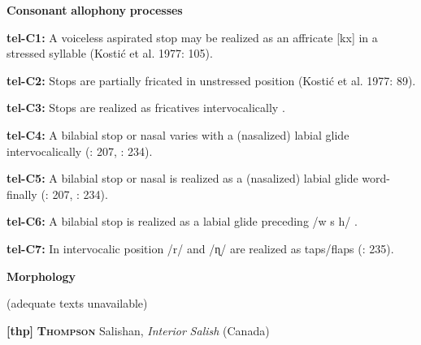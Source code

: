 \begin{styleBody}
\textbf{Consonant} \textbf{allophony} \textbf{processes}
\end{styleBody}

\begin{styleBody}
\textbf{tel-C1:} A voiceless aspirated stop may be realized as an affricate [kx] in a stressed syllable (Kostić et al. 1977: 105).
\end{styleBody}

\begin{styleBody}
\textbf{tel-C2:} Stops are partially fricated in unstressed position (Kostić et al. 1977: 89).
\end{styleBody}

\begin{styleBody}
\textbf{tel-C3:} Stops are realized as fricatives intervocalically \citep[207]{Krishnamurti1998}.
\end{styleBody}

\begin{styleBody}
\textbf{tel-C4:} A bilabial stop or nasal varies with a (nasalized) labial glide intervocalically (\citealt{Krishnamurti1998}: 207, \citealt{BhaskararaoRay2017}: 234).
\end{styleBody}

\begin{styleBody}
\textbf{tel-C5:} A bilabial stop or nasal is realized as a (nasalized) labial glide word-finally (\citealt{Krishnamurti1998}: 207, \citealt{BhaskararaoRay2017}: 234).
\end{styleBody}

\begin{styleBody}
\textbf{tel-C6:} A bilabial stop is realized as a labial glide preceding /w s h/ \citep[207]{Krishnamurti1998}.
\end{styleBody}

\begin{styleBody}
\textbf{tel-C7:} In intervocalic position /r/ and /ɳ/ are realized as taps/flaps (\citealt{BhaskararaoRay2017}: 235).
\end{styleBody}

\begin{styleBody}
\textbf{Morphology}
\end{styleBody}

\begin{styleBody}
(adequate texts unavailable)
\end{styleBody}

\begin{styleBody}
\textbf{[thp]}   \textbf{\textsc{Thompson}}  Salishan, \textit{Interior} \textit{Salish} (Canada)
\end{styleBody}

